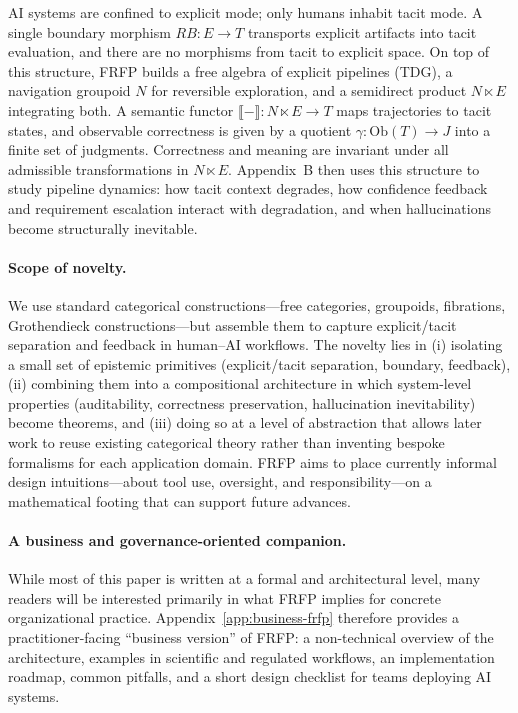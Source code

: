 \documentclass[11pt]{article}
\theoremstyle{definition}
\begin{document}
AI systems are confined to explicit mode; only humans inhabit tacit mode. A single boundary morphism \(RB : E \to T\) transports explicit artifacts into tacit evaluation, and there are no morphisms from tacit to explicit space. On top of this structure, FRFP builds a free algebra of explicit pipelines (TDG), a navigation groupoid \(N\) for reversible exploration, and a semidirect product \(N \ltimes E\) integrating both. A semantic functor \(\llbracket - \rrbracket : N \ltimes E \to T\) maps trajectories to tacit states, and observable correctness is given by a quotient \(\gamma : \mathrm{Ob}(T) \to J\) into a finite set of judgments. Correctness and meaning are invariant under all admissible transformations in \(N \ltimes E\). Appendix~B then uses this structure to study pipeline dynamics: how tacit context degrades, how confidence feedback and requirement escalation interact with degradation, and when hallucinations become structurally inevitable.

\paragraph{Scope of novelty.}
We use standard categorical constructions---free categories, groupoids, fibrations, Grothendieck constructions---but assemble them to capture explicit/tacit separation and feedback in human--AI workflows. The novelty lies in (i) isolating a small set of epistemic primitives (explicit/tacit separation, boundary, feedback), (ii) combining them into a compositional architecture in which system-level properties (auditability, correctness preservation, hallucination inevitability) become theorems, and (iii) doing so at a level of abstraction that allows later work to reuse existing categorical theory rather than inventing bespoke formalisms for each application domain. FRFP aims to place currently informal design intuitions---about tool use, oversight, and responsibility---on a mathematical footing that can support future advances.

\paragraph{A business and governance-oriented companion.}
While most of this paper is written at a formal and architectural level, many readers will be interested primarily in what FRFP implies for concrete organizational practice.
Appendix~\ref{app:business-frfp} therefore provides a practitioner-facing ``business version'' of FRFP: a non-technical overview of the architecture, examples in scientific and regulated workflows, an implementation roadmap, common pitfalls, and a short design checklist for teams deploying AI systems.
\end{document}
